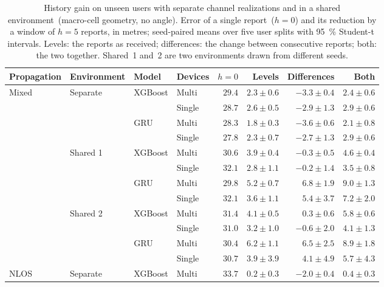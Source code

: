 \begin{table}[h]
  \centering
  \caption{History gain on unseen users with separate channel realizations and in a shared environment~(macro-cell geometry, no angle). Error of a single report~($h=0$) and its reduction by a window of $h=5$ reports, in metres; seed-paired means over five user splits with \SI{95}{\percent} Student-t intervals. Levels: the reports as received; differences: the change between consecutive reports; both: the two together. Shared~1 and~2 are two environments drawn from different seeds.}
  \label{tab:shared-env}
  \small
  \begin{tabular}{@{}llllrrrr@{}}
    \toprule
    Propagation & Environment & Model & Devices & $h=0$ & Levels & Differences & Both \\
    \midrule
    Mixed & Separate & XGBoost & Multi  & $29.4$ & $2.3 \pm 0.6$ & $-3.3 \pm 0.4$ & $2.4 \pm 0.6$ \\
          &          &         & Single & $28.7$ & $2.6 \pm 0.5$ & $-2.9 \pm 1.3$ & $2.9 \pm 0.6$ \\
          &          & GRU     & Multi  & $28.3$ & $1.8 \pm 0.3$ & $-3.6 \pm 0.6$ & $2.1 \pm 0.8$ \\
          &          &         & Single & $27.8$ & $2.3 \pm 0.7$ & $-2.7 \pm 1.3$ & $2.9 \pm 0.6$ \\
    \cmidrule{2-8}
          & Shared 1 & XGBoost & Multi  & $30.6$ & $3.9 \pm 0.4$ & $-0.3 \pm 0.5$ & $4.6 \pm 0.4$ \\
          &          &         & Single & $32.1$ & $2.8 \pm 1.1$ & $-0.2 \pm 1.4$ & $3.5 \pm 0.8$ \\
          &          & GRU     & Multi  & $29.8$ & $5.2 \pm 0.7$ & $6.8 \pm 1.9$  & $9.0 \pm 1.3$ \\
          &          &         & Single & $32.1$ & $3.6 \pm 1.1$ & $5.4 \pm 3.7$  & $7.2 \pm 2.0$ \\
    \cmidrule{2-8}
          & Shared 2 & XGBoost & Multi  & $31.4$ & $4.1 \pm 0.5$ & $0.3 \pm 0.6$  & $5.8 \pm 0.6$ \\
          &          &         & Single & $31.0$ & $3.2 \pm 1.0$ & $-0.6 \pm 2.0$ & $4.1 \pm 1.3$ \\
          &          & GRU     & Multi  & $30.4$ & $6.2 \pm 1.1$ & $6.5 \pm 2.5$  & $8.9 \pm 1.8$ \\
          &          &         & Single & $30.7$ & $3.9 \pm 3.9$ & $4.1 \pm 4.9$  & $5.7 \pm 4.3$ \\
    \midrule
    NLOS  & Separate & XGBoost & Multi  & $33.7$ & $0.2 \pm 0.3$  & $-2.0 \pm 0.4$ & $0.4 \pm 0.3$ \\

\end{tabular}
\end{table}
